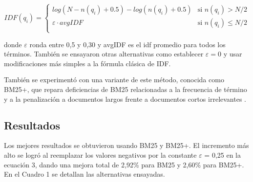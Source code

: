 \documentclass[a4paper]{article}
\begin{document}
\begin{equation}
 IDF(q_i) =
  \begin{cases}
       log(N - n(q_i) + 0.5) - log(n(q_i) + 0.5)    & \text{si }  n(q_i) > N/2\\
       \varepsilon \cdot avgIDF                     & \text{si }  n(q_i) \leq N/2\\
  \end{cases}
\end{equation}                
                
donde $\varepsilon$ ronda entre 0,5 y 0,30 y avgIDF es el idf promedio para todos los términos.
También se ensayaron otras alternativas como establecer $\varepsilon = 0$ y usar modificaciones más simples a la fórmula clásica de IDF.

También se experimentó con una variante de este método, conocida como BM25+, que repara deficiencias de BM25 relacionadas a la frecuencia de término y a la penalización a documentos largos frente a documentos cortos irrelevantes \cite{lv}.


\subsection{Resultados}
Los mejores resultados se obtuvieron usando BM25 y BM25+. El incremento más alto se logró al reemplazar los valores negativos por la constante $\varepsilon$ = 0,25 en la ecuación 3, dando una mejora total de 2,92\% para BM25 y 2,60\% para BM25+. En el Cuadro 1 se detallan las alternativas ensayadas.
\end{document}
